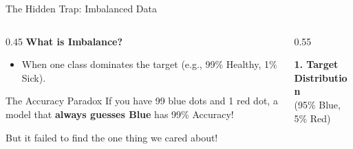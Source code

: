 \begin{frame}{The Hidden Trap: Imbalanced Data}

    \begin{columns}[c]
        \begin{column}{0.45\textwidth}
            \textbf{What is Imbalance?}
            \begin{itemize}
                \item When one class dominates the target (e.g., 99\% Healthy, 1\% Sick).
            \end{itemize}
            
            \vspace{1em}
            \begin{alertblock}{The Accuracy Paradox}
                If you have 99 blue dots and 1 red dot, a model that \textbf{always guesses Blue} has 99\% Accuracy!
                \vspace{0.5em}
                
                But it failed to find the one thing we cared about!
            \end{alertblock}
        \end{column}
        
        \begin{column}{0.55\textwidth}
            \centering
            
            \textbf{1. Target Distribution} \\(95\% Blue, 5\% Red)
            \vspace{0.2em}
            
            \vspace{0.8em}
            

\end{column}
\end{columns}
\end{frame}
